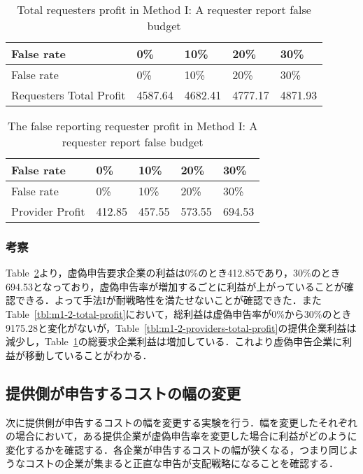 \hypertarget{tbl:m1-2-requesters-total-profit}{}
\begin{longtable}[H]{@{}lllll@{}}
\caption{\label{tbl:m1-2-requesters-total-profit}Total requesters profit
in Method I: A requester report false budget}\tabularnewline
\toprule
False rate & 0\% & 10\% & 20\% & 30\%\tabularnewline
\midrule
\endfirsthead
\toprule
False rate & 0\% & 10\% & 20\% & 30\%\tabularnewline
\midrule
\endhead
Requesters Total Profit & 4587.64 & 4682.41 & 4777.17 &
4871.93\tabularnewline
\bottomrule
\end{longtable}

\hypertarget{tbl:m1-2-false-requester-profit}{}
\begin{longtable}[H]{@{}lllll@{}}
\caption{\label{tbl:m1-2-false-requester-profit}The false reporting
requester profit in Method I: A requester report false
budget}\tabularnewline
\toprule
False rate & 0\% & 10\% & 20\% & 30\%\tabularnewline
\midrule
\endfirsthead
\toprule
False rate & 0\% & 10\% & 20\% & 30\%\tabularnewline
\midrule
\endhead
Provider Profit & 412.85 & 457.55 & 573.55 & 694.53\tabularnewline
\bottomrule
\end{longtable}

\hypertarget{ux8003ux5bdf-1}{%
\subsubsection{考察}\label{ux8003ux5bdf-1}}

Table~\ref{tbl:m1-2-false-requester-profit}より，虚偽申告要求企業の利益は0\%のとき412.85であり，30\%のとき694.53となっており，虚偽申告率が増加するごとに利益が上がっていることが確認できる．よって手法Iが耐戦略性を満たせないことが確認できた．またTable~\ref{tbl:m1-2-total-profit}において，総利益は虚偽申告率が0\%から30\%のとき9175.28と変化がないが，Table~\ref{tbl:m1-2-providers-total-profit}の提供企業利益は減少し，Table~\ref{tbl:m1-2-requesters-total-profit}の総要求企業利益は増加している．これより虚偽申告企業に利益が移動していることがわかる．

\hypertarget{ux63d0ux4f9bux5074ux304cux7533ux544aux3059ux308bux30b3ux30b9ux30c8ux306eux5e45ux306eux5909ux66f4}{%
\subsection{提供側が申告するコストの幅の変更}\label{ux63d0ux4f9bux5074ux304cux7533ux544aux3059ux308bux30b3ux30b9ux30c8ux306eux5e45ux306eux5909ux66f4}}

次に提供側が申告するコストの幅を変更する実験を行う．幅を変更したそれぞれの場合において，ある提供企業が虚偽申告率を変更した場合に利益がどのように変化するかを確認する．各企業が申告するコストの幅が狭くなる，つまり同じようなコストの企業が集まると正直な申告が支配戦略になることを確認する．


